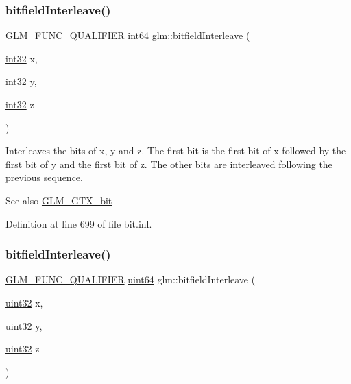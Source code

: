 \subsubsection{\texorpdfstring{bitfield\+Interleave()}{bitfieldInterleave()}\hspace{0.1cm}{\footnotesize\ttfamily [11/16]}}
{\footnotesize\ttfamily \hyperlink{setup_8hpp_a33fdea6f91c5f834105f7415e2a64407}{G\+L\+M\+\_\+\+F\+U\+N\+C\+\_\+\+Q\+U\+A\+L\+I\+F\+I\+ER} \hyperlink{group__gtc__type__precision_ga435d75819cce297cc5fa21bd84ef89a5}{int64} glm\+::bitfield\+Interleave (\begin{DoxyParamCaption}\item[{\hyperlink{group__gtc__type__precision_ga632d8b25f6b61659f39ea4321fab92a4}{int32}}]{x,  }\item[{\hyperlink{group__gtc__type__precision_ga632d8b25f6b61659f39ea4321fab92a4}{int32}}]{y,  }\item[{\hyperlink{group__gtc__type__precision_ga632d8b25f6b61659f39ea4321fab92a4}{int32}}]{z }\end{DoxyParamCaption})}

Interleaves the bits of x, y and z. The first bit is the first bit of x followed by the first bit of y and the first bit of z. The other bits are interleaved following the previous sequence.

\begin{DoxySeeAlso}{See also}
\hyperlink{group__gtx__bit}{G\+L\+M\+\_\+\+G\+T\+X\+\_\+bit} 
\end{DoxySeeAlso}


Definition at line 699 of file bit.\+inl.

\mbox{\label{group__gtx__bit_ga7c10eb37f608365cfaef5ca2c476e1ce}} 
\subsubsection{\texorpdfstring{bitfield\+Interleave()}{bitfieldInterleave()}\hspace{0.1cm}{\footnotesize\ttfamily [12/16]}}
{\footnotesize\ttfamily \hyperlink{setup_8hpp_a33fdea6f91c5f834105f7415e2a64407}{G\+L\+M\+\_\+\+F\+U\+N\+C\+\_\+\+Q\+U\+A\+L\+I\+F\+I\+ER} \hyperlink{group__gtc__type__precision_gae3632bf9b37da66233d78930dd06378a}{uint64} glm\+::bitfield\+Interleave (\begin{DoxyParamCaption}\item[{\hyperlink{group__gtc__type__precision_ga202b6a53c105fcb7e531f9b443518451}{uint32}}]{x,  }\item[{\hyperlink{group__gtc__type__precision_ga202b6a53c105fcb7e531f9b443518451}{uint32}}]{y,  }\item[{\hyperlink{group__gtc__type__precision_ga202b6a53c105fcb7e531f9b443518451}{uint32}}]{z }\end{DoxyParamCaption})}

